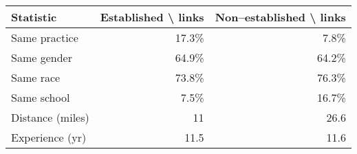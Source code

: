 \begin{table}[!h]
\centering
\begin{tabular}{lrr}
\toprule
Statistic & Established \textbackslash{} links & Non--established \textbackslash{} links\\
\midrule
Same practice & 17.3\% & 7.8\%\\
Same gender & 64.9\% & 64.2\%\\
Same race & 73.8\% & 76.3\%\\
Same school & 7.5\% & 16.7\%\\
Distance (miles) & 11 & 26.6\\
\addlinespace
Experience (yr) & 11.5 & 11.6\\
\bottomrule
\end{tabular}
\end{table}

